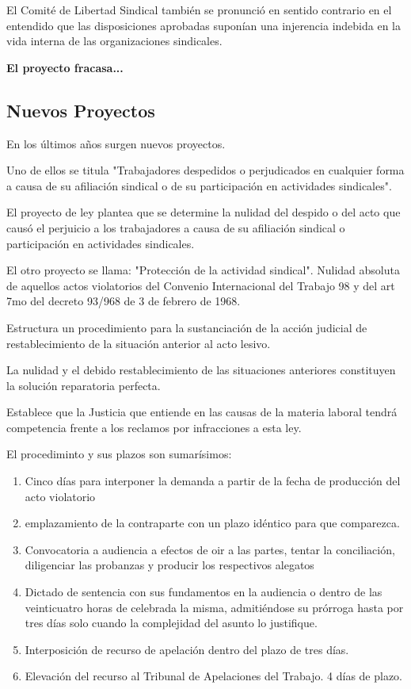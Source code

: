 \documentclass[spanish,12pt,a4paper,titlepage]{report}
\begin{document}
El Comité de Libertad Sindical también se pronunció en sentido contrario en el entendido que las disposiciones aprobadas suponían una injerencia indebida en la vida interna de las organizaciones sindicales.

\textbf{El proyecto fracasa...}

\subsection{Nuevos Proyectos}
En los últimos años surgen nuevos proyectos.

Uno de ellos se titula "Trabajadores despedidos o perjudicados en cualquier forma a causa de su afiliación sindical o de su participación en actividades sindicales".

El proyecto de ley plantea que se determine la nulidad del despido o del acto que causó el perjuicio a los trabajadores a causa de su afiliación sindical o participación en actividades sindicales.

El otro proyecto se llama: "Protección de la actividad sindical". Nulidad absoluta de aquellos actos violatorios del Convenio Internacional del Trabajo 98 y del art 7mo del decreto 93/968 de 3 de febrero de 1968.

Estructura un procedimiento para la sustanciación de la acción judicial de restablecimiento de la situación anterior al acto lesivo.

La nulidad y el debido restablecimiento de las situaciones anteriores constituyen la solución reparatoria perfecta.

Establece que la Justicia que entiende en las causas de la materia laboral tendrá competencia frente a los reclamos por infracciones a esta ley.

El procediminto y sus plazos son sumarísimos:

\begin{enumerate}
\item Cinco días para interponer la demanda a partir de la fecha de producción del acto violatorio
\item emplazamiento de la contraparte con un plazo idéntico para que comparezca.
\item Convocatoria a audiencia a efectos de oir a las partes, tentar la conciliación, diligenciar las probanzas y producir los respectivos alegatos
\item Dictado de sentencia con sus fundamentos en la audiencia o dentro de las veinticuatro horas de celebrada la misma, admitiéndose su prórroga hasta por tres días solo cuando la complejidad del asunto lo justifique.
\item Interposición de recurso de apelación dentro del plazo de tres días.
\item Elevación del recurso al Tribunal de Apelaciones del Trabajo. 4 días de plazo.
\end{enumerate} 
\end{document}
